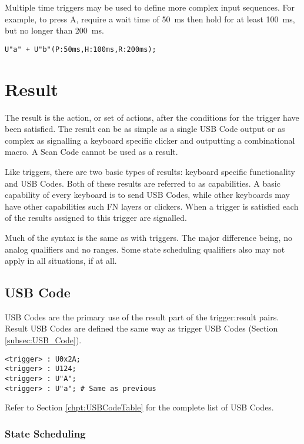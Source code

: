 \documentclass{kiibohd-template}
\begin{document}
Multiple time triggers may be used to define more complex input sequences.
For example, to press A, require a wait time of 50~ms then hold for at least 100~ms, but no longer than 200~ms.

\begin{lstlisting}
U"a" + U"b"(P:50ms,H:100ms,R:200ms);
\end{lstlisting}


\section{Result}

The result is the action, or set of actions, after the conditions for the trigger have been satisfied.
The result can be as simple as a single USB Code output or as complex as signalling a keyboard specific clicker and outputting a combinational macro.
A Scan Code cannot be used as a result.

Like triggers, there are two basic types of results: keyboard specific functionality and USB Codes.
Both of these results are referred to as capabilities.
A basic capability of every keyboard is to send USB Codes, while other keyboards may have other capabilities such FN layers or clickers.
When a trigger is satisfied each of the results assigned to this trigger are signalled.

Much of the syntax is the same as with triggers.
The major difference being, no analog qualifiers and no ranges.
Some state scheduling qualifiers also may not apply in all situations, if at all.


\subsection{USB Code}

USB Codes are the primary use of the result part of the trigger:result pairs.
Result USB Codes are defined the same way as trigger USB Codes (Section \ref{subsec:USB_Code}).

\begin{lstlisting}
<trigger> : U0x2A;
<trigger> : U124;
<trigger> : U"A";
<trigger> : U"a"; # Same as previous
\end{lstlisting}

Refer to Section \ref{chpt:USBCodeTable} for the complete list of USB Codes.


\subsubsection{State Scheduling}
\label{subsubsec:resultusbcodestateschedule}
\end{document}
